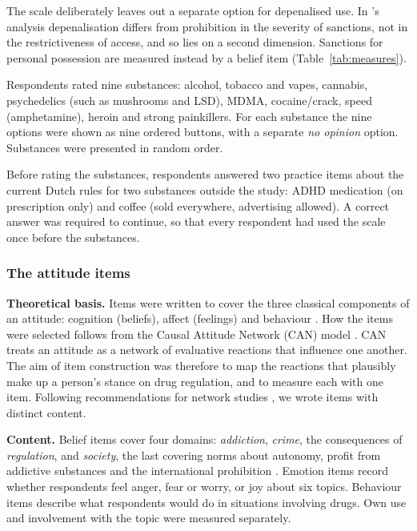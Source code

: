 The scale deliberately leaves out a separate option for depenalised use. In \citeauthor{maccoun2001}'s
analysis depenalisation differs from prohibition in the severity of sanctions, not in the
restrictiveness of access, and so lies on a second dimension. Sanctions for personal possession are
measured instead by a belief item (Table~\ref{tab:measures}).

Respondents rated nine substances: alcohol, tobacco and vapes, cannabis, psychedelics (such as
mushrooms and LSD), MDMA, cocaine/crack, speed (amphetamine), heroin and strong painkillers. For each
substance the nine options were shown as nine ordered buttons, with a separate \emph{no opinion}
option. Substances were presented in random order.

Before rating the substances, respondents answered two practice items about the current Dutch rules
for two substances outside the study: ADHD medication (on prescription only) and coffee (sold
everywhere, advertising allowed). A correct answer was required to continue, so that every respondent
had used the scale once before the substances.

\subsubsection{The attitude items}

\textbf{Theoretical basis.} Items were written to cover the three classical components of an
attitude: cognition (beliefs), affect (feelings) and behaviour \parencite{rosenberg1960,eagly1993}.
How the items were selected follows from the Causal Attitude Network (CAN) model
\parencite{dalege2016,dalege2018}. CAN treats an attitude as a network of evaluative reactions that
influence one another. The aim of item construction was therefore to map the reactions that plausibly
make up a person's stance on drug regulation, and to measure each with one item. Following
recommendations for network studies \parencite{burger2022,chambon2026}, we wrote items with distinct
content.

\textbf{Content.} Belief items cover four domains: \emph{addiction}, \emph{crime}, the consequences of
\emph{regulation}, and \emph{society}, the last covering norms about autonomy, profit from addictive
substances and the international prohibition \parencite[cf.][]{vangelder2024}. Emotion items record
whether respondents feel anger, fear or worry, or joy about six topics. Behaviour items describe what
respondents would do in situations involving drugs. Own use and involvement with the topic were
measured separately.

